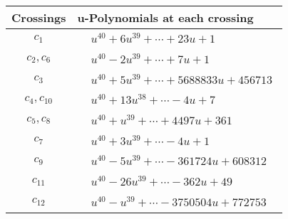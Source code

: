\documentclass[1p]{elsarticle_modified}
\theoremstyle{definition}
\begin{document}
\begin{tabular}{m{50pt}|m{274pt}}
Crossings & \hspace{64pt}u-Polynomials at each crossing \\
\hline $$\begin{aligned}c_{1}\end{aligned}$$&$\begin{aligned}
&u^{40}+6 u^{39}+\cdots+23 u+1
\end{aligned}$\\
\hline $$\begin{aligned}c_{2},c_{6}\end{aligned}$$&$\begin{aligned}
&u^{40}-2 u^{39}+\cdots+7 u+1
\end{aligned}$\\
\hline $$\begin{aligned}c_{3}\end{aligned}$$&$\begin{aligned}
&u^{40}+5 u^{39}+\cdots+5688833 u+456713
\end{aligned}$\\
\hline $$\begin{aligned}c_{4},c_{10}\end{aligned}$$&$\begin{aligned}
&u^{40}+13 u^{38}+\cdots-4 u+7
\end{aligned}$\\
\hline $$\begin{aligned}c_{5},c_{8}\end{aligned}$$&$\begin{aligned}
&u^{40}+u^{39}+\cdots+4497 u+361
\end{aligned}$\\
\hline $$\begin{aligned}c_{7}\end{aligned}$$&$\begin{aligned}
&u^{40}+3 u^{39}+\cdots-4 u+1
\end{aligned}$\\
\hline $$\begin{aligned}c_{9}\end{aligned}$$&$\begin{aligned}
&u^{40}-5 u^{39}+\cdots-361724 u+608312
\end{aligned}$\\
\hline $$\begin{aligned}c_{11}\end{aligned}$$&$\begin{aligned}
&u^{40}-26 u^{39}+\cdots-362 u+49
\end{aligned}$\\
\hline $$\begin{aligned}c_{12}\end{aligned}$$&$\begin{aligned}
&u^{40}- u^{39}+\cdots-3750504 u+772753
\end{aligned}$\\
\hline
\end{tabular}\\~\\
\end{document}
